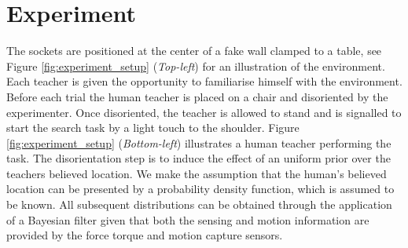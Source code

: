 




% 
%




\section{Experiment}\label{ch4:experiment}

The sockets are positioned at the center of a fake wall clamped to a table, see Figure \ref{fig:experiment_setup} (\textit{Top-left})
for an illustration of the environment. Each teacher is given the opportunity to familiarise himself with 
the environment. Before each trial the human teacher is placed on a chair and disoriented by the experimenter. Once disoriented,
the teacher is allowed to stand and is signalled to start the search task by a light touch to the shoulder.
Figure \ref{fig:experiment_setup} (\textit{Bottom-left}) illustrates a human teacher performing the task. The disorientation
step is to induce the effect of an uniform prior over the teachers believed location. We make the assumption that the human's 
believed location can be presented by a probability density function, which is assumed to be known. All subsequent 
distributions can be obtained through the application of a Bayesian filter given that both the sensing and motion 
information are provided by the force torque and motion capture sensors.

